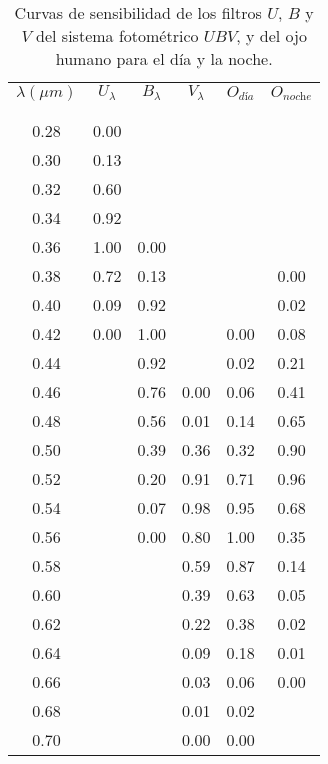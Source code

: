 \documentclass[12pt,a4paper]{practice}
\begin{document}
\begin{problem}
        \begin{table}[h!]
            \centering
            \begin{tabular}{ c | c | c | c | c | c }
                $\lambda(\mu m)$  & $U_\lambda$  & $B_\lambda$  & $V_\lambda$  & $O_{\textit{d\'ia}}$  & $O_{\textit{noche}}$ \\
                &  &  &  &  &  \\[-0.8em]\hline
                &  &  &  &  &  \\[-0.8em]
                0.28  & 0.00  &  &  &  &  \\
                0.30  & 0.13  &  &  &  &  \\
                0.32  & 0.60  &  &  &  &  \\
                0.34  & 0.92  &  &  &  &  \\
                0.36  & 1.00  & 0.00  &  &  &  \\
                0.38  & 0.72  & 0.13  &  &  & 0.00 \\
                0.40  & 0.09  & 0.92  &  &  & 0.02 \\
                0.42  & 0.00  & 1.00  &  & 0.00  & 0.08 \\
                0.44  &  & 0.92  &  & 0.02  & 0.21 \\
                0.46  &  & 0.76  & 0.00  & 0.06  & 0.41 \\
                0.48  &  & 0.56  & 0.01  & 0.14  & 0.65 \\
                0.50  &  & 0.39  & 0.36  & 0.32  & 0.90 \\
                0.52  &  & 0.20  & 0.91  & 0.71  & 0.96 \\
                0.54  &  & 0.07  & 0.98  & 0.95  & 0.68 \\
                0.56  &  & 0.00  & 0.80  & 1.00  & 0.35 \\
                0.58  &  &  & 0.59  & 0.87  & 0.14 \\
                0.60  &  &  & 0.39  & 0.63  & 0.05 \\
                0.62  &  &  & 0.22  & 0.38  & 0.02 \\
                0.64  &  &  & 0.09  & 0.18  & 0.01 \\
                0.66  &  &  & 0.03  & 0.06  & 0.00 \\
                0.68  &  &  & 0.01  & 0.02  &  \\
                0.70  &  &  & 0.00  & 0.00  &  \\
                \hline
            \end{tabular}
            \caption{
                Curvas de sensibilidad de los filtros $U$, $B$ y $V$ del sistema fotométrico $UBV$, y del ojo humano para el día y la noche.
            }\label{table:1}
        \end{table}


\end{problem}
\end{document}
